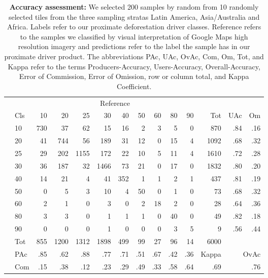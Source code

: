 			\begin{table}[ht]
				\centering
				\caption[Accuracy assessment]{\textbf{Accuracy assessment:} We selected 200 samples by random from 10 randomly selected tiles from the three sampling stratas Latin America, Asia/Australia and Africa. Labels refer to our proximate deforestation driver classes. Reference refers to the samples we classified by visual interpretation of Google Maps high resolution imagery and predictions refer to the label the sample has in our proximate driver product. The abbreviations PAc, UAc, OvAc, Com, Om, Tot, and Kappa refer to the terms Producers-Accuracy, Users-Accuracy, Overall-Accuracy, Error of Commission, Error of Omission, row or column total, and Kappa Coefficient.}
				\label{tab:results_confusion_matrix}
				\begin{tabular}{llrrrrrrrrrrrr}
					\hline
					& & \multicolumn{9}{c}{Reference} & & & \\\cline{3-11}
					& Cls & 10 & 20 & 25 & 30 & 40 & 50 & 60 & 80 & 90 & Tot & UAc & Om \\\hline
					\multirow{9}{*}{\STAB{\rotatebox[origin=c]{90}{Prediction}}}
					& 10 & 730 & 37 & 62 & 15 & 16 & 2 & 3 & 5 & 0 & 870 & .84 & .16 \\ 
					& 20 & 41 & 744 & 56 & 189 & 31 & 12 & 0 & 15 & 4 & 1092 & .68 & .32 \\ 
					& 25 & 29 & 202 & 1155 & 172 & 22 & 10 & 5 & 11 & 4 & 1610 & .72 & .28 \\ 
					& 30 & 36 & 187 & 32 & 1466 & 73 & 21 & 0 & 17 & 0 & 1832 & .80 & .20 \\ 
					& 40 & 14 & 21 & 4 & 41 & 352 & 1 & 1 & 2 & 1 & 437 & .81 & .19 \\ 
					& 50 & 0 & 5 & 3 & 10 & 4 & 50 & 0 & 1 & 0 & 73 & .68 & .32 \\ 
					& 60 & 2 & 1 & 0 & 3 & 0 & 2 & 18 & 2 & 0 & 28 & .64 & .36 \\ 
					& 80 & 3 & 3 & 0 & 1 & 1 & 1 & 0 & 40 & 0 & 49 & .82 & .18 \\ 
					& 90 & 0 & 0 & 0 & 1 & 0 & 0 & 0 & 3 & 5 & 9 & .56 & .44 \\\hline 
					& Tot & 855 & 1200 & 1312 & 1898 & 499 & 99 & 27 & 96 & 14 & 6000 & & \\
					& PAc & .85 & .62 & .88 & .77 & .71 & .51 & .67 & .42 & .36 & Kappa & \multicolumn{2}{r}{OvAc} \\
					& Com & .15 & .38 & .12 & .23 & .29 & .49 & .33 & .58 & .64 & .69 & \multicolumn{2}{r}{.76} \\ \hline
				\end{tabular}
			\end{table}

